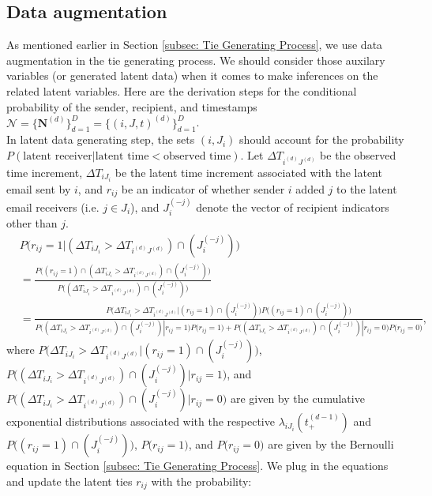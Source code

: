 \documentclass[a4paper]{article}
\begin{document}
  \subsection{Data augmentation} \label{subsec: Data augmentation}
  As mentioned earlier in Section \ref{subsec: Tie Generating Process}, we use data augmentation in the tie generating process. We should consider those auxilary variables (or generated latent data)  when it comes to make inferences on the related latent variables. Here are the derivation steps for the conditional probability of the sender, recipient, and timestamps $\mathcal{N} = \{\boldsymbol{N}^{(d)}\}_{d=1}^D=\{(i, J, t)^{(d)}\}_{d=1}^D$.\\\newline  In latent data generating step, the sets $(i, J_i)$ should account for the probability $P(\mbox{latent receiver}| \mbox{latent time} < \mbox{observed time})$. Let $\Delta T_{i^{(d)}{J^{(d)}}}$ be the observed time increment, $\Delta T_{i{J_i}}$ be the latent time increment associated with the latent email sent by $i$, and $r_{ij}$ be an indicator of whether sender $i$ added $j$ to the latent email receivers (i.e. $j \in J_i$), and $J_i^{(-j)}$ denote the vector of recipient indicators other than $j$. 
  \begin{equation}
  \begin{split}
&P\Big(r_{ij}=1|(\Delta T_{i{J_i}} > \Delta T_{i^{(d)}{J^{(d)}}})\cap( J_i^{(-j)})\Big)\\ &=\frac{P\Big((r_{ij}=1)\cap (\Delta T_{i{J_i}} > \Delta T_{i^{(d)}{J^{(d)}}})\cap (J_i^{(-j)})\Big)}{P\Big((\Delta T_{i{J_i}} > \Delta T_{i^{(d)}{J^{(d)}}})\cap (J_i^{(-j)})\Big)}\\
& = \frac{P\Big(\Delta T_{i{J_i}} > \Delta T_{i^{(d)}{J^{(d)}}} | (r_{ij}=1)\cap (J_i^{(-j)})\Big)P\Big((r_{ij}=1) \cap (J_i^{(-j)})\Big)}{P\Big((\Delta T_{i{J_i}} > \Delta T_{i^{(d)}{J^{(d)}}})\cap (J_i^{(-j)})|r_{ij}=1\Big)P\Big(r_{ij}=1\Big)+P\Big( (\Delta T_{i{J_i}} > \Delta T_{i^{(d)}{J^{(d)}}}) \cap (J_i^{(-j)})|r_{ij}=0\Big)P\Big(r_{ij}=0\Big)},
  \end{split}
  \end{equation}
  where $P\Big(\Delta T_{i{J_i}} > \Delta T_{i^{(d)}{J^{(d)}}} | (r_{ij}=1)\cap (J_i^{(-j)})\Big)$, $P\Big((\Delta T_{i{J_i}}> \Delta T_{i^{(d)}{J^{(d)}}})\cap (J_i^{(-j)})|r_{ij}=1\Big)$, and $P\Big((\Delta T_{i{J_i}}> \Delta T_{i^{(d)}{J^{(d)}}})\cap (J_i^{(-j)})|r_{ij}=0\Big)$ are given by the cumulative exponential distributions associated with the respective $\lambda_{iJ_i}(t_+^{(d-1)})$ and $P\Big((r_{ij}=1) \cap (J_i^{(-j)})\Big)$,  $P\Big(r_{ij}=1\Big)$, and $P\Big(r_{ij}=0\Big)$ are given by the Bernoulli equation in Section \ref{subsec: Tie Generating Process}. We plug in the equations and update the latent ties $r_{ij}$ with the probability:
\end{document}
